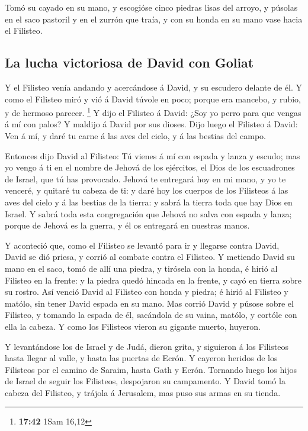  Tomó su cayado en su mano, y escogióse cinco piedras lisas
del arroyo, y púsolas en el saco pastoril y en el zurrón que traía, y
con su honda en su mano vase hacia el Filisteo.

\hypertarget{la-lucha-victoriosa-de-david-con-goliat}{%
\subsection{La lucha victoriosa de David con
Goliat}\label{la-lucha-victoriosa-de-david-con-goliat}}

 Y el Filisteo venía andando y acercándose á David, y su
escudero delante de él.  Y como el Filisteo miró y vió á
David túvole en poco; porque era mancebo, y rubio, y de hermoso parecer.
\footnote{\textbf{17:42} 1Sam 16,12}  Y dijo el Filisteo á
David: ¿Soy yo perro para que vengas á mí con palos? Y maldijo á David
por sus dioses.  Dijo luego el Filisteo á David: Ven á mí,
y daré tu carne á las aves del cielo, y á las bestias del campo.

 Entonces dijo David al Filisteo: Tú vienes á mí con espada
y lanza y escudo; mas yo vengo á ti en el nombre de Jehová de los
ejércitos, el Dios de los escuadrones de Israel, que tú has provocado.
 Jehová te entregará hoy en mi mano, y yo te venceré, y
quitaré tu cabeza de ti: y daré hoy los cuerpos de los Filisteos á las
aves del cielo y á las bestias de la tierra: y sabrá la tierra toda que
hay Dios en Israel.  Y sabrá toda esta congregación que
Jehová no salva con espada y lanza; porque de Jehová es la guerra, y él
os entregará en nuestras manos.

 Y aconteció que, como el Filisteo se levantó para ir y
llegarse contra David, David se dió priesa, y corrió al combate contra
el Filisteo.  Y metiendo David su mano en el saco, tomó de
allí una piedra, y tirósela con la honda, é hirió al Filisteo en la
frente: y la piedra quedó hincada en la frente, y cayó en tierra sobre
su rostro.  Así venció David al Filisteo con honda y
piedra; é hirió al Filisteo y matólo, sin tener David espada en su mano.
 Mas corrió David y púsose sobre el Filisteo, y tomando la
espada de él, sacándola de su vaina, matólo, y cortóle con ella la
cabeza. Y como los Filisteos vieron su gigante muerto, huyeron.

 Y levantándose los de Israel y de Judá, dieron grita, y
siguieron á los Filisteos hasta llegar al valle, y hasta las puertas de
Ecrón. Y cayeron heridos de los Filisteos por el camino de Saraim, hasta
Gath y Ecrón.  Tornando luego los hijos de Israel de seguir
los Filisteos, despojaron su campamento.  Y David tomó la
cabeza del Filisteo, y trájola á Jerusalem, mas puso sus armas en su
tienda.

